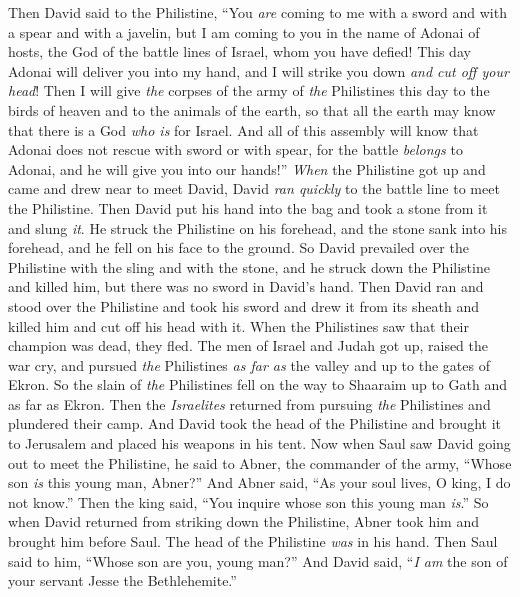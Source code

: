 \begin{biblechapter}
\verse Then David said to the Philistine, “You \textit{are} coming to me with a sword and with a spear and with a javelin, but I am coming to you in the name of Adonai of hosts, the God of the battle lines of Israel, whom you have defied!
\verse This day Adonai will deliver you into my hand, and I will strike you down \textit{and cut off your head}! Then I will give \textit{the} corpses of the army of \textit{the} Philistines this day to the birds of heaven and to the animals of the earth, so that all the earth may know that there is a God \textit{who is} for Israel.
\verse And all of this assembly will know that Adonai does not rescue with sword or with spear, for the battle \textit{belongs} to Adonai, and he will give you into our hands!”
 \textit{When} the Philistine got up and came and drew near to meet David, David \textit{ran quickly} to the battle line to meet the Philistine.
\verse Then David put his hand into the bag and took a stone from it and slung \textit{it}. He struck the Philistine on his forehead, and the stone sank into his forehead, and he fell on his face to the ground.
\verse So David prevailed over the Philistine with the sling and with the stone, and he struck down the Philistine and killed him, but there was no sword in David’s hand.
\verse Then David ran and stood over the Philistine and took his sword and drew it from its sheath and killed him and cut off his head with it. When the Philistines saw that their champion was dead, they fled.
\verse The men of Israel and Judah got up, raised the war cry, and pursued \textit{the} Philistines \textit{as far as} the valley and up to the gates of Ekron. So the slain of \textit{the} Philistines fell on the way to Shaaraim up to Gath and as far as Ekron.
\verse Then the \textit{Israelites} returned from pursuing \textit{the} Philistines and plundered their camp.
\verse And David took the head of the Philistine and brought it to Jerusalem and placed his weapons in his tent.
\verse Now when Saul saw David going out to meet the Philistine, he said to Abner, the commander of the army, “Whose son \textit{is} this young man, Abner?” And Abner said, “As your soul lives, O king, I do not know.”
\verse Then the king said, “You inquire whose son this young man \textit{is}.”
\verse So when David returned from striking down the Philistine, Abner took him and brought him before Saul. The head of the Philistine \textit{was} in his hand.
\verse Then Saul said to him, “Whose son are you, young man?” And David said, “\textit{I am} the son of your servant Jesse the Bethlehemite.”
\end{biblechapter}

